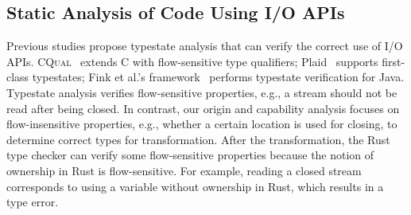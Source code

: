 \subsection{Static Analysis of Code Using I/O APIs}

Previous studies propose typestate analysis that can verify the correct use of
I/O APIs.
%
\textsc{CQual}~\cite{foster2002type} extends C with flow-sensitive type
qualifiers;
%
Plaid~\cite{sunshine2011first} supports first-class typestates;
%
Fink et al.'s framework~\cite{fink2008effective} performs typestate verification
for Java.
%
Typestate analysis verifies flow-sensitive properties, e.g., a stream should not
be read after being closed.
%
In contrast, our origin and capability analysis focuses on flow-insensitive
properties, e.g., whether a certain location is used for closing, to determine
correct types for transformation.
%
After the transformation, the Rust type checker can verify some flow-sensitive
properties because the notion of ownership in Rust is flow-sensitive.
%
For example, reading a closed stream corresponds to using a variable without
ownership in Rust, which results in a type error.
